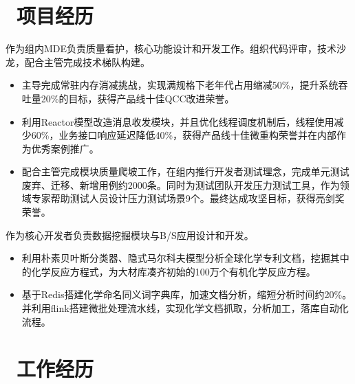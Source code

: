 \documentclass{resume}
\begin{document}



\section{\faBriefcase\ 项目经历}

\begin{onehalfspacing}
作为组内MDE负责质量看护，核心功能设计和开发工作。组织代码评审，技术沙龙，配合主管完成技术梯队构建。
\begin{itemize}
  \item 主导完成常驻内存消减挑战，实现满规格下老年代占用缩减50\%，提升系统吞吐量20\%的目标，获得产品线十佳QCC改进荣誉。
  \item 利用Reactor模型改造消息收发模块，并且优化线程调度机制后，线程使用减少60\%，业务接口响应延迟降低40\%，获得产品线十佳微重构荣誉并在内部作为优秀案例推广。
  \item 配合主管完成模块质量爬坡工作，在组内推行开发者测试理念，完成单元测试废弃、迁移、新增用例约2000条。同时为测试团队开发压力测试工具，作为领域专家帮助测试人员设计压力测试场景9个。最终达成攻坚目标，获得亮剑奖荣誉。
\end{itemize}
\end{onehalfspacing}

\begin{onehalfspacing}
作为核心开发者负责数据挖掘模块与B/S应用设计和开发。
\begin{itemize}
  \item 利用朴素贝叶斯分类器、隐式马尔科夫模型分析全球化学专利文档，挖掘其中的化学反应方程式，为大材库凑齐初始的100万个有机化学反应方程。
  \item 基于Redis搭建化学命名同义词字典库，加速文档分析，缩短分析时间约20\%。并利用flink搭建微批处理流水线，实现化学文档抓取，分析加工，落库自动化流程。
\end{itemize}
\end{onehalfspacing}

\section{\faUsers\ 工作经历}
\role{JAVA开发工程师}{职级：15}
\end{document}
